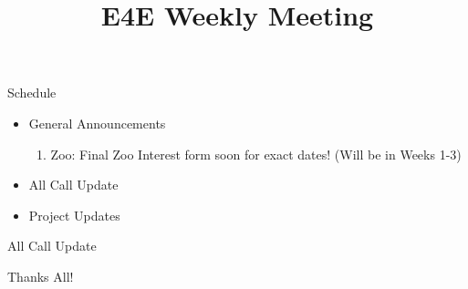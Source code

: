 \documentclass[aspectratio=169]{beamer}
\title{E4E Weekly Meeting}
\institute{UC San Diego}
\begin{document}
\maketitle
\begin{frame}{Schedule}
    \begin{itemize}
        \item General Announcements
              \begin{enumerate}
                \item{Zoo: Final Zoo Interest form soon for exact dates! (Will be in Weeks 1-3)}
              \end{enumerate}
        \item All Call Update
              \begin{enumerate}
                  
              \end{enumerate}
        \item Project Updates
              \begin{enumerate}
                  
              \end{enumerate}
    \end{itemize}
\end{frame}

\begin{frame}{All Call Update}
    \begin{enumerate}
        
    \end{enumerate}
\end{frame}

\begin{frame}
    \centering
    Thanks All!
\end{frame}
\end{document}
